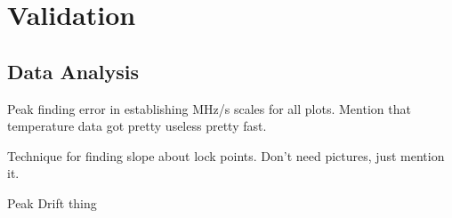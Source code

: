 \newpage
\section{Validation}

\subsection{Data Analysis}

Peak finding error in establishing MHz/s scales for all plots. Mention that temperature data got pretty useless pretty fast.

Technique for finding slope about lock points. Don't need pictures, just mention it.

Peak Drift thing
